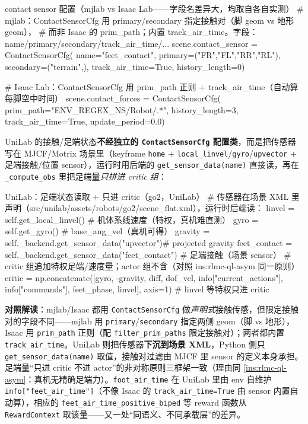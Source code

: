 \begin{codebox}[Python]{contact sensor 配置（mjlab vs Isaac Lab——字段名差异大，均取自各自实测）}
# mjlab：ContactSensorCfg 用 primary/secondary 指定接触对（脚 geom vs 地形 geom），
#   而非 Isaac 的 prim_path；内置 track_air_time。字段：name/primary/secondary/track_air_time/...
scene.contact_sensor = ContactSensorCfg(
    name="feet_contact", primary=("FR","FL","RR","RL"), secondary=("terrain",),
    track_air_time=True, history_length=0)

# Isaac Lab：ContactSensorCfg 用 prim_path 正则 + track_air_time（自动算每脚空中时间）
scene.contact_forces = ContactSensorCfg(
    prim_path="{ENV_REGEX_NS}/Robot/.*",
    history_length=3, track_air_time=True, update_period=0.0)
\end{codebox}

UniLab 的接触/足端状态\textbf{不经独立的 \texttt{ContactSensorCfg} 配置类}，而是把传感器写在 MJCF/Motrix 场景里（keyframe \verb|home| + \verb|local_linvel|/\verb|gyro|/\verb|upvector| + 足端接触/位置 sensor），运行时用后端的 \verb|get_sensor_data(name)| 直接读，再在 \verb|_compute_obs| 里把足端量\emph{只拼进 critic 组}：

\begin{codebox}[Python]{UniLab：足端状态读取 + 只进 critic（go2，UniLab）}
# 传感器在场景 XML 里声明（src/unilab/assets/robots/go2/scene_flat.xml），运行时后端读：
linvel  = self.get_local_linvel()                  # 机体系线速度（特权，真机难直测）
gyro    = self.get_gyro()                           # base_ang_vel（真机可得）
gravity = self._backend.get_sensor_data("upvector")# projected gravity
feet_contact = self._backend.get_sensor_data("feet_contact")   # 足端接触（场景 sensor）
# critic 组追加特权足端/速度量；actor 组不含（对照 ins:rlmc-ql-asym 同一原则）
critic = np.concatenate([gyro, -gravity, diff, dof_vel,
                         info["current_actions"], info["commands"],
                         feet_phase, linvel], axis=1)   # linvel 等特权只进 critic
\end{codebox}

\textbf{对照解读}：mjlab/Isaac 都用 \verb|ContactSensorCfg| 做\emph{声明式}接触传感，但限定接触对的字段不同——mjlab 用 \verb|primary|/\verb|secondary| 指定两侧 geom（脚 vs 地形），Isaac 用 \verb|prim_path| 正则（配 \verb|filter_prim_paths| 限定接触对）；两者都内置 \verb|track_air_time|。UniLab 则把传感器\textbf{下沉到场景 XML}，Python 侧只 \verb|get_sensor_data(name)| 取值，接触对过滤由 MJCF 里 sensor 的定义本身承担。足端量“只进 critic 不进 actor”的非对称原则三框架一致（理由同 \cref{ins:rlmc-ql-asym}：真机无精确足端力）。\verb|foot_air_time| 在 UniLab 里由 env 自维护 \verb|info["feet_air_time"]|（不像 Isaac 的 \verb|track_air_time=True| 由 sensor 内置自动算），相应的 \verb|feet_air_time_positive_biped| 等 reward 函数从 \verb|RewardContext| 取该量——又一处“同语义、不同承载层”的差异。

